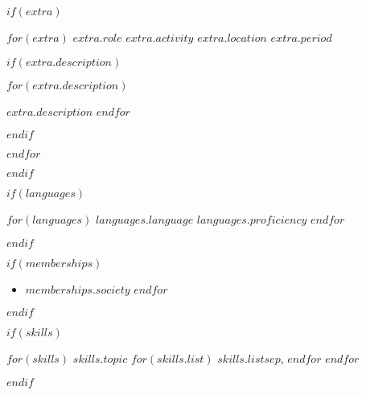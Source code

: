 \documentclass[12pt, letterpaper]{awesome-cv}
\begin{document}
$if(extra)$
  \begin{cventries}

    $for(extra)$
      \cventry
      {$extra.role$}
      {$extra.activity$}
      {$extra.location$}
      {$extra.period$}
      {
        $if(extra.description)$
          \begin{cvitems}
            $for(extra.description)$
              \item{$extra.description$}
            $endfor$
          \end{cvitems}
        $endif$
      }

    $endfor$
  \end{cventries}
$endif$

$if(languages)$
  \begin{cvskills}
    $for(languages)$
      \cvskill
      {$languages.language$}
      {$languages.proficiency$}
    $endfor$
  \end{cvskills}
$endif$

$if(memberships)$

    \begin{cvparagraph}
        \begin{itemize}[noitemsep]
          $for(memberships)$
            \item {$memberships.society$}
          $endfor$
      \end{itemize}
    \end{cvparagraph}
$endif$

$if(skills)$
  \begin{cvskills}
    $for(skills)$
      \cvskill
      {$skills.topic$}
      {
        $for(skills.list)$
          $skills.list$$sep$,
        $endfor$
      }
    $endfor$
  \end{cvskills}
$endif$


\end{document}
